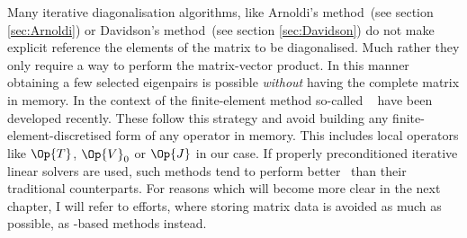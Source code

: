 Many iterative diagonalisation algorithms,
like Arnoldi's method~(see section \ref{sec:Arnoldi})
or Davidson's method~(see section \ref{sec:Davidson})
do not make explicit reference the elements of the matrix to be diagonalised.
Much rather they only require a way to perform the matrix-vector product.
In this manner obtaining a few selected eigenpairs
is possible \emph{without} having the complete matrix in memory.
In the context of the finite-element method
so-called ~\cite{Kronbichler2012}
have been developed recently.
These follow this strategy and avoid
building any finite-element-discretised form of any operator in memory.
This includes local operators like $\Op{T}$, $\Op{V}_0$ or $\Op{J}$ in our case.
If properly preconditioned iterative linear solvers are used,
such methods tend to perform better~\cite{Kronbichler2012}
than their traditional counterparts.
For reasons which will become more clear in the next chapter,
I will refer to efforts,
where storing matrix data is avoided as much as possible,
as \contraction-based methods instead.

